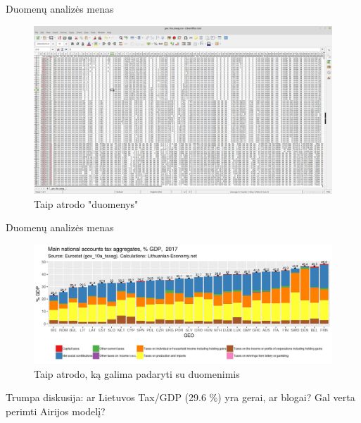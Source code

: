 \documentclass[11pt,xcolor=table]{beamer}
\begin{document}
\begin{frame}{Duomenų analizės menas}
\begin{figure}
\caption{Taip atrodo "duomenys"}
\includegraphics[scale=0.17]{raw_data.png}
\end{figure}
\end{frame}


\begin{frame}{Duomenų analizės menas}
\begin{figure}
\caption{Taip atrodo, ką galima padaryti su duomenimis}
\includegraphics[scale=0.45]{Tax_GDP_2017_EU.jpeg}
\end{figure}
Trumpa diskusija: ar Lietuvos Tax/GDP (29.6 \%) yra gerai, ar blogai?
Gal verta perimti Airijos modelį?
\end{frame}


\end{document}
